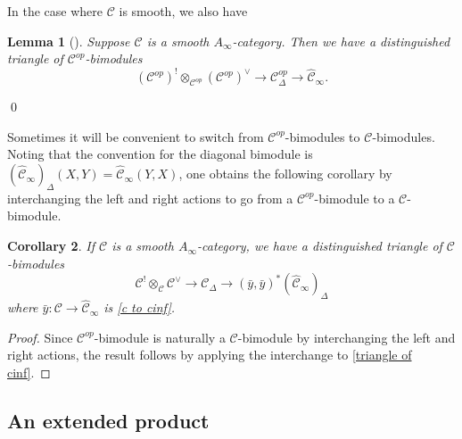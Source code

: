 \documentclass[11pt]{amsproc}
\def\cc{\mathcal{C}}
\def\D{\Delta}
\def\ainf{A_\infty}
\def\cinf{\widehat{\cc}_{\infty}}
\newtheorem{lem}{Lemma}[section]
\newtheorem{cor}[lem]{Corollary}
\theoremstyle{remark}
\numberwithin{equation}{section}
\begin{document}
In the case where $\cc$ is smooth, we also have

\begin{lem}[{\cite[Proposition 2.11]{GGV}}]\label{lem: cinf smooth cone}
Suppose $\cc$ is a smooth $\ainf$-category. 
Then we have a distinguished triangle of $\cc^{op}$-bimodules
\begin{equation}\label{triangle of cinf}
(\cc^{op})^{!} \otimes_{\cc^{op}} (\cc^{op})^{\vee} \to \cc^{op}_{\D} \to \cinf.
\end{equation}
\end{lem} \qed

Sometimes it will be convenient to switch from $\cc^{op}$-bimodules to $\cc$-bimodules.
Noting that the convention for the diagonal bimodule is $(\cinf)_{\D}(X, Y) = \cinf(Y, X)$,
one obtains the following corollary by interchanging the left and right actions to go from a $\cc^{op}$-bimodule to a $\cc$-bimodule.

\begin{cor}\label{cor: cinf smooth cone}
If $\cc$ is a smooth $\ainf$-category, 
we have a distinguished triangle of $\cc$-bimodules
\begin{equation}
\cc^{!} \otimes_{\cc} \cc^{\vee} \to \cc_{\D} \to (\bar{y}, \bar{y})^{*}(\cinf)_{\D}
\end{equation}
where $\bar{y}: \cc \to \cinf$ is \eqref{c to cinf}.
\end{cor}
\begin{proof}
Since $\cc^{op}$-bimodule is naturally a $\cc$-bimodule by interchanging the left and right actions,
the result follows by applying the interchange to \eqref{triangle of cinf}.
\end{proof}


\subsection{An extended product}\label{section: cup product}
\end{document}
